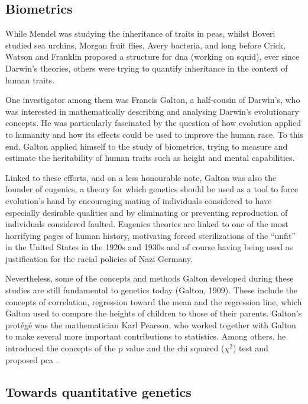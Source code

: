 \subsection{Biometrics} %
While Mendel was studying the inheritance of traits in peas, whilst Boveri studied sea urchins, Morgan fruit flies, Avery bacteria, and long before Crick, Watson and Franklin proposed a structure for \gls{dna} (working on squid), ever since Darwin’s theories, others were trying to quantify inheritance in the context of human traits.

One investigator among them was Francis Galton, a half-cousin of Darwin’s, who was interested in mathematically describing and analysing Darwin’s evolutionary concepts. 
He was particularly fascinated by the question of how evolution applied to humanity and how its effects could be used to improve the human race. 
To this end, Galton applied himself to the study of biometrics, trying to measure and estimate the heritability of human traits such as height and mental capabilities. 

Linked to these efforts, and on a less honourable note, Galton was also the founder of eugenics, a theory for which genetics should be used as a tool to force evolution’s hand by encouraging mating of individuals considered to have especially desirable qualities and by eliminating or preventing reproduction of individuals considered faulted. Eugenics theories are linked to one of the most horrifying pages of human history, motivating forced sterilizations of the “unfit” in the United States in the 1920s and 1930s and of course having being used as justification for the racial policies of Nazi Germany.

Nevertheless, some of the concepts and methods Galton developed during these studies are still fundamental to genetics today (Galton, 1909). 
These include the concepts of correlation, regression toward the mean and the regression line, which Galton used to compare the heights of children to those of their parents. Galton’s protégé was the mathematician Karl Pearson, who worked together with Galton to make several more important contributions to statistics. Among others, he introduced the concepts of the p value and the chi squared ($\chi^2$) test \cite{pearson1900x} and proposed \gls{pca} \cite{pearson1901liii}.

\subsection{Towards quantitative genetics} %

